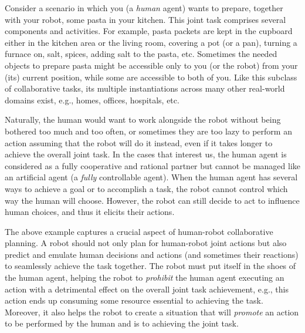 \documentclass[letterpaper]{article} %
\begin{document}
Consider a scenario in which you (a \textit{human} agent) wants to prepare, together with your robot, some pasta in your kitchen. This joint task comprises several components and activities. For example, pasta packets are kept in the cupboard either in the kitchen area or the living room, covering a pot (or a pan), turning a furnace on, salt, spices, adding salt to the pasta, etc. 
Sometimes the needed objects to prepare pasta might be accessible only to you (or the robot) from your (its) current position, while some are accessible to both of you. 
Like this subclass of collaborative tasks, its multiple instantiations across many other real-world domains exist, e.g., homes, offices, hospitals, etc.

Naturally, the human would want to work alongside the robot without being bothered too much and too often, or sometimes they are too lazy to perform an action assuming that the robot will do it instead, even if it takes longer to achieve the overall joint task. 
In the cases that interest us, the human agent is considered as a fully cooperative and rational partner but cannot be managed like an artificial agent (a \textit{fully} controllable agent). When the human agent has several ways to achieve a goal or to accomplish a task, the robot cannot control which way the human will choose.  However, the robot can still decide to act to influence human choices, and thus it elicits their actions. 

The above example captures a crucial aspect of human-robot collaborative planning. A robot should not only plan for human-robot joint actions but also predict and emulate human decisions and actions (and sometimes their reactions) to seamlessly achieve the task together. 
The robot must put itself in the shoes of the human agent, helping the robot to \textit{prohibit} the human agent executing an action with a detrimental effect on the overall joint task achievement, e.g., this action ends up consuming some resource essential to achieving the task. 
Moreover, it also helps the robot to create a situation that will \textit{promote} an action to be performed by the human and is  to achieving the joint task.       
\end{document}
